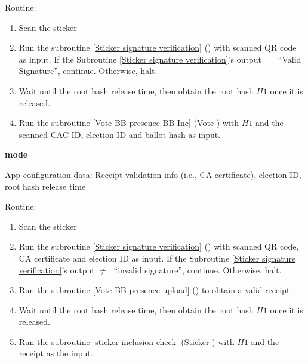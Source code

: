 \documentclass{article}
\begin{document}
Routine:
\begin{enumerate}
    \item Scan the sticker
    \item Run the subroutine \ref{Sticker signature verification} (\StickersignatureVerification{}) with scanned QR code as input. If the Subroutine \ref{Sticker signature verification}'s output $=$ ``Valid Signature'', continue. Otherwise, halt.
    \item Wait until the root hash release time, then obtain the root hash $H1$ once it is released.
    \item Run the subroutine \ref{Vote BB presence-BB Inc} (Vote \BBInclusionCheck{}) with  $H1$ and the scanned CAC ID, election ID and ballot hash as input. 
    
\end{enumerate}

\textbf{\StickerBBUpload{}{} mode}

App configuration data: Receipt validation info (i.e., CA certificate), election ID, root hash release time


Routine:
\begin{enumerate}
    \item Scan the sticker
    \item Run the subroutine \ref{Sticker signature verification} (\StickersignatureVerification{}) with scanned QR code, CA certificate and election ID as input. If the Subroutine \ref{Sticker signature verification}'s output $\neq\;$ ``invalid signature'', continue. Otherwise, halt.
    \item Run the subroutine \ref{Vote BB presence-upload} (\StickerBBUpload{}) to obtain a valid receipt.
    \item Wait until the root hash release time, then obtain the root hash $H1$ once it is released.
    \item Run the subroutine \ref{sticker inclusion check} (Sticker \BBInclusionCheck{}) with  $H1$ and the receipt as the input.
\end{enumerate}
\end{document}
